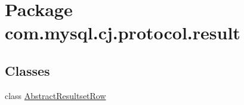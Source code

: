 \hypertarget{namespacecom_1_1mysql_1_1cj_1_1protocol_1_1result}{}\section{Package com.\+mysql.\+cj.\+protocol.\+result}
\label{namespacecom_1_1mysql_1_1cj_1_1protocol_1_1result}
\subsection*{Classes}
\begin{DoxyCompactItemize}
\item 
class \mbox{\hyperlink{classcom_1_1mysql_1_1cj_1_1protocol_1_1result_1_1_abstract_resultset_row}{Abstract\+Resultset\+Row}}
\end{DoxyCompactItemize}
